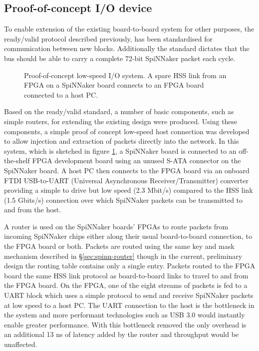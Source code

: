 			\subsection{Proof-of-concept I/O device}
				
				
				To enable extension of the existing board-to-board system for other
				purposes, the ready/valid protocol described previously, has been
				standardised for communication between new blocks. Additionally the
				standard dictates that the bus should be able to carry a complete 72-bit
				SpiNNaker packet each cycle.
				
				\begin{figure}
					\center
					
					
					\caption[Proof-of-concept low-speed I/O system.]{Proof-of-concept
					low-speed I/O system. A spare HSS link from an FPGA on a SpiNNaker
					board connects to an FPGA board connected to a host PC.}
					\label{fig:proof-of-concept-fpga-links}
				\end{figure}
				
				Based on the ready/valid standard, a number of basic components, such as
				simple routers, for extending the existing design were produced. Using
				these components, a simple proof of concept low-speed host connection
				was developed to allow injection and extraction of packets directly into
				the network. In this system, which is sketched in figure
				\ref{fig:proof-of-concept-fpga-links}, a SpiNNaker board is connected to
				an off-the-shelf FPGA development board
				\cite{raggedstone2} using an unused S-ATA connector on the SpiNNaker
				board. A host PC then connects to the FPGA board via an onboard FTDI
				USB-to-UART (Universal Asynchronous Receiver/Transmitter) converter
				providing a simple to drive but low speed (2.3 Mbit/s) compared to the
				HSS link (1.5 Gbits/s) connection over which SpiNNaker packets can be
				transmitted to and from the host.
				
				A router is used on the SpiNNaker boards' FPGAs to route packets from
				incoming SpiNNaker chips either along their usual board-to-board
				connection, to the FPGA board or both.  Packets are routed using the
				same key and mask mechanism described in \S\ref{sec:spinn-router} though
				in the current, preliminary design the routing table contains only a
				single entry.  Packets routed to the FPGA board the same HSS link
				protocol as board-to-board links to travel to and from the FPGA board.
				On the FPGA, one of the eight streams of packets is fed to a UART block
				which uses a simple protocol to send and receive SpiNNaker packets at
				low speed to a host PC. The UART connection to the host is the
				bottleneck in the system and more performant technologies such as USB
				3.0 would instantly enable greater performance. With this bottleneck
				removed the only overhead is an additional 13 ns of latency added by the
				router and throughput would be unaffected.
				
